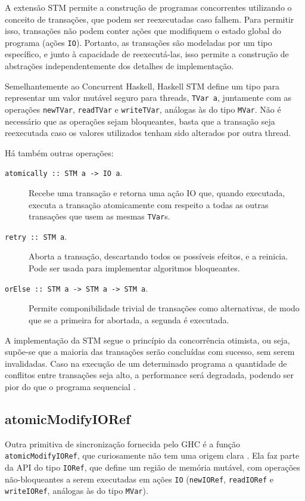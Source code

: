 \documentclass[a4paper,12pt,oldfontcommands]{abntex2}
\begin{document}
A extensão STM permite a construção de programas concorrentes utilizando o conceito de transações, que podem ser reexecutadas caso falhem. Para permitir isso, transações não podem conter ações que modifiquem o estado global do programa (ações \texttt{IO}). Portanto, as transações são modeladas por um tipo específico, e junto à capacidade de reexecutá-las, isso permite a construção de abstrações independentemente dos detalhes de implementação.

Semelhantemente ao Concurrent Haskell, Haskell STM define um tipo para representar um valor mutável seguro para threads, \texttt{TVar a}, juntamente com as operações \texttt{newTVar}, \texttt{readTVar} e \texttt{writeTVar}, análogas às do tipo \texttt{MVar}. Não é necessário que as operações sejam bloqueantes, basta que a transação seja reexecutada caso os valores utilizados tenham sido alterados por outra thread.

Há também outras operações:

\begin{description}
\item [\texttt{atomically :: STM a -> IO a}.] Recebe uma transação e retorna uma ação IO que, quando executada, executa a transação atomicamente com respeito a todas as outras transações que usem as mesmas \texttt{TVar}s.
\item [\texttt{retry :: STM a}.] Aborta a transação, descartando todos os possíveis efeitos, e a reinicia. Pode ser usada para implementar algoritmos bloqueantes.
\item [\texttt{orElse :: STM a -> STM a -> STM a}.] Permite componibilidade trivial de transações como alternativas, de modo que se a primeira for abortada, a segunda é executada.
\end{description}

A implementação da STM segue o princípio da concorrência otimista, ou seja, supõe-se que a maioria das transações serão concluídas com sucesso, sem serem invalidadas. Caso na execução de um determinado programa a quantidade de conflitos entre transações seja alto, a performance será degradada, podendo ser pior do que o programa sequencial \cite{sulzmann2009comparing}.

\subsection{atomicModifyIORef}\label{subsection-atomicmodifyioref}

Outra primitiva de sincronização fornecida pelo GHC é a função \texttt{atomicModifyIORef}, que curiosamente não tem uma origem clara \cite{sulzmann2009comparing}. Ela faz parte da API do tipo \texttt{IORef}, que define um região de memória mutável, com operações não-bloqueantes a serem executadas em ações \texttt{IO} (\texttt{newIORef}, \texttt{readIORef} e \texttt{writeIORef}, análogas às do tipo \texttt{MVar}).
\end{document}
